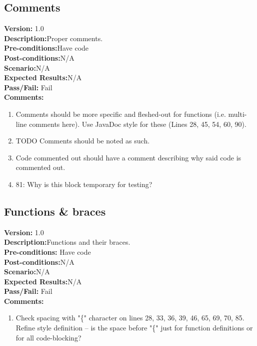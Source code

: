 \documentclass[12pt]{article}
\begin{document}
    \subsection{Comments}
    \textbf{Version:} 1.0\\
    \textbf{Description:}Proper comments.\\
    \textbf{Pre-conditions:}Have code\\
    \textbf{Post-conditions:}N/A\\
    \textbf{Scenario:}N/A\\
    \textbf{Expected Results:}N/A\\
    \textbf{Pass/Fail:} Fail\\
    \textbf{Comments:}
    \begin{enumerate}
        \item Comments should be more specific and fleshed-out for functions (i.e. multi-line comments here). Use JavaDoc style for these (Lines 28, 45, 54, 60, 90).
        \item TODO Comments should be noted as such.
        \item Code commented out should have a comment describing why said code is commented out.
        \item 81:  Why is this block temporary for testing?
    \end{enumerate}

    \subsection{Functions \& braces}
    \textbf{Version:} 1.0\\
    \textbf{Description:}Functions and their braces.\\
    \textbf{Pre-conditions:} Have code\\
    \textbf{Post-conditions:}N/A\\
    \textbf{Scenario:}N/A\\
    \textbf{Expected Results:}N/A\\
    \textbf{Pass/Fail:} Fail\\
    \textbf{Comments:}
    \begin{enumerate}
        \item Check spacing with "\{" character on lines 28, 33, 36, 39, 46, 65, 69, 70, 85. Refine style definition -- is the space before "\{" just for function definitions or for all code-blocking?
    \end{enumerate}
\end{document}
